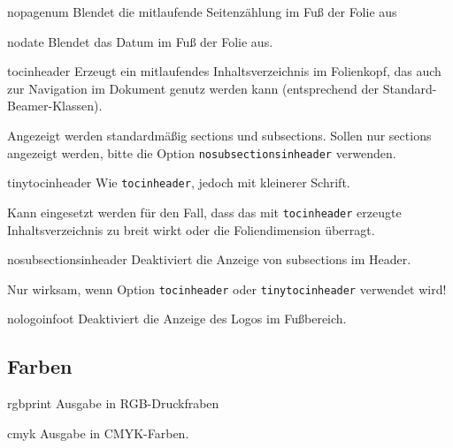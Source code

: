 \documentclass[a4paper,colorscheme=green,TUBStitlepage=picture]{tubsreprt}
\begin{document}
\begin{classoption}{nopagenum}
  Blendet die mitlaufende Seitenzählung im Fuß der Folie aus
\end{classoption}

\begin{classoption}{nodate}
  Blendet das Datum im Fuß der Folie aus.
\end{classoption}

\begin{classoption}{tocinheader}
  Erzeugt ein mitlaufendes Inhaltsverzeichnis im Folienkopf,
  das auch zur Navigation im Dokument genutz werden kann
  (entsprechend der Standard-Beamer-Klassen).
  
  Angezeigt werden standardmäßig sections und subsections.
  Sollen nur sections angezeigt werden, bitte die Option
  \lstinline{nosubsectionsinheader} verwenden.
  
\end{classoption}

\begin{classoption}{tinytocinheader}
  Wie \lstinline{tocinheader}, jedoch mit kleinerer Schrift.

  Kann eingesetzt werden für den Fall, dass das mit \lstinline{tocinheader}
  erzeugte Inhaltsverzeichnis zu breit wirkt oder die Foliendimension
  überragt.
\end{classoption}

\begin{classoption}{nosubsectionsinheader}
  Deaktiviert die Anzeige von subsections im Header.
  
  Nur wirksam, wenn Option \lstinline{tocinheader} oder
  \lstinline{tinytocinheader} verwendet wird!
\end{classoption}

\begin{classoption}{nologoinfoot}
  Deaktiviert die Anzeige des Logos im Fußbereich.
\end{classoption}

\subsection{Farben}

\begin{classoption}{rgbprint}
  Ausgabe in RGB-Druckfraben
\end{classoption}

\begin{classoption}{cmyk}
  Ausgabe in CMYK-Farben.
\end{classoption}
\end{document}
